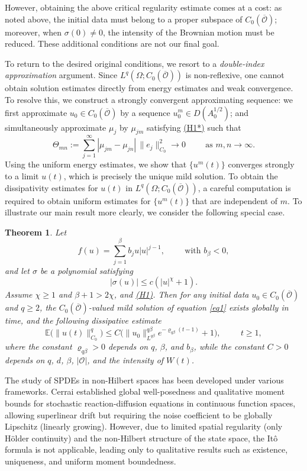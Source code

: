 \documentclass[10pt]{article}
\numberwithin{figure}{section}
\numberwithin{equation}{section}
\newtheorem{theorem}{Theorem}[section]
\newcommand{\0}{{\theta}}
\def\Hs{\hspace{1cm}}\def\hs{\hspace{0.5cm}}
\begin{document}
However, obtaining the above critical regularity estimate comes at a cost: as noted above, the initial data must belong to a proper subspace of $C_0(\overline{\mathcal{O}})$; moreover, when $\sigma(0) \neq 0$, the intensity of the Brownian motion must be reduced. These additional conditions are not our final goal.

To return to the desired original conditions, we resort to a {\sl double-index approximation} argument. Since $L^q(\Omega; C_0(\overline{\mathcal{O}}))$ is non-reflexive,  one cannot obtain solution estimates directly from energy estimates and weak convergence. To resolve this, we construct a strongly convergent approximating sequence: we first approximate $u_0 \in  C_0(\overline{\mathcal{O}})$ by a sequence $u_0^m \in D(A_0^{1/2})$; and simultaneously approximate $\mu_j$ by $\mu_{jm}$ satisfying \hyperref[H1*]{(H1*)} such that
$$
\Theta_{mn} := \sum_{j=1}^\infty |\mu_{jm} - \mu_{jn}| \,\|e_j\|_{C_0}^2 \to 0 \Hs \text{as } m,n\to\infty.
$$
Using the uniform energy estimates, we show that $\{u^m(t)\}$ converges strongly to a limit $u(t)$, which is precisely the unique mild solution. To obtain the dissipativity estimates for $u(t)$ in $L^q(\Omega; C_0(\overline{\mathcal{O}}))$, a careful computation is required to obtain uniform estimates for $\{u^m(t)\}$ that are independent of $m$.
\vs
To illustrate our main result more clearly, we consider the following special case.
\begin{theorem}
Let
$$
f(u) = \sum_{j=1}^{\beta} b_j u|u|^{j-1}, \Hs \text{with } b_\beta < 0,
$$
and let $\sigma$ be a polynomial satisfying
$$
|\sigma(u)| \le c(|u|^\chi + 1).
$$
Assume $\chi \ge 1$ and $\beta + 1 > 2\chi$, and \hyperref[H1]{(H1)}.
Then for any initial data $u_0 \in C_0(\overline{\mathcal{O}})$ and $q\ge2$, the $C_0(\overline{\mathcal{O}})$-valued mild solution of equation \eqref{eq1} exists globally in time, and the following dissipative estimate
$$
\mathbb{E}\big(\| u(t) \|_{C_0}^q\big) \le C \Big( \| u_0 \|_{L^{q\beta}}^{q\beta} e^{-\varrho_{q\beta}(t-1)} + 1 \Big), \Hs t \ge 1,
$$
 where the constant $\varrho_{q\beta}>0$ depends on $q$, $\beta$, and $b_\beta$, while the constant $C>0$ depends on $q$, $d$, $\beta$, $|\mathcal{O}|$, 
and the intensity of $W(t)$.
\end{theorem}

The study of SPDEs in non-Hilbert spaces has been developed under various frameworks.
Cerrai \cite{Cerrai2003} established global well-posedness and qualitative moment bounds for  stochastic reaction-diffusion equations in continuous function spaces, allowing superlinear drift but requiring the noise coefficient to be globally Lipschitz (linearly growing). However, due to limited spatial regularity (only H\"older continuity) and the non-Hilbert structure of the state space, the It\^o formula is not applicable, leading only to qualitative results such as existence, uniqueness, and uniform moment boundedness.
\end{document}
